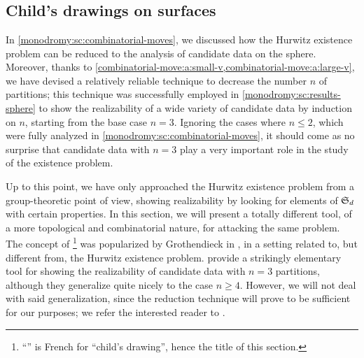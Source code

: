 \chapter{\texorpdfstring{\Dessins{}}{Dessins d'enfant}}

\section{Child's drawings on surfaces}
\smallvertices

In \cref{monodromy:sc:combinatorial-moves}, we discussed how the Hurwitz existence problem can be reduced to the analysis of candidate data on the sphere. Moreover, thanks to \cref{combinatorial-move:a:small-v,combinatorial-move:a:large-v}, we have devised a relatively reliable technique to decrease the number $n$ of partitions; this technique was successfully employed in \cref{monodromy:sc:results-sphere} to show the realizability of a wide variety of candidate data by induction on $n$, starting from the base case $n=3$. Ignoring the cases where $n\le 2$, which were fully analyzed in \cref{monodromy:sc:combinatorial-moves}, it should come as no surprise that candidate data with $n=3$ play a very important role in the study of the existence problem.

Up to this point, we have only approached the Hurwitz existence problem from a group-theoretic point of view, showing realizability by looking for elements of $\symgroup[d]$ with certain properties. In this section, we will present a totally different tool, of a more topological and combinatorial nature, for attacking the same problem. The concept of \emph{\dessins{}}\footnote{``\emph{\Dessin{}}'' is French for ``child's drawing'', hence the title of this section.} was popularized by Grothendieck in \cite{grothendieck}, in a setting related to, but different from, the Hurwitz existence problem. \Dessins{} provide a strikingly elementary tool for showing the realizability of candidate data with $n=3$ partitions, although they generalize quite nicely to the case $n\ge 4$. However, we will not deal with said generalization, since the reduction technique will prove to be sufficient for our purposes; we refer the interested reader to .

